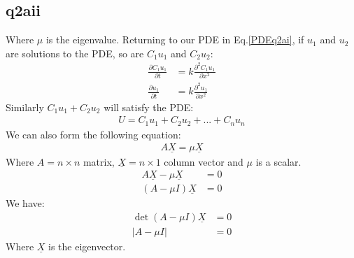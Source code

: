 \documentclass[11pt]{article}
\numberwithin{equation}{section}
\begin{document}
\subsection*{q2aii}
Where $\mu$ is the eigenvalue. Returning to our PDE in Eq.\ref{PDEq2ai}, if $u_1$ and $u_2$ are solutions to the PDE, so are $C_1 u_1$ and $C_2 u_2$:
\begin{align}
	\frac{\partial C_1 u_1}{\partial t} &= k\frac{\partial^2 C_1 u_1}{\partial x^2}\\
	\frac{\partial u_1}{\partial t} &= k\frac{\partial^2 u_1}{\partial x^2}
\end{align}
Similarly $C_1 u_1 + C_2 u_2$ will satisfy the PDE:
\begin{align}
	U = C_1 u_1 + C_2 u_2 + ... + C_n u_n
\end{align}
We can also form the following equation:
\begin{align}
	A\underline{X} = \mu \underline{X}
\end{align}
Where $A = n \times n$ matrix, $\underline{X} = n \times 1$ column vector and $\mu$ is a scalar. 
\begin{align}
	A \underline{X} - \mu \underline{X} &= 0\\
	\left( A - \mu I\right)\underline{X} &= 0
\end{align} 
We have:
\begin{align}
	\det \left(A - \mu I\right)\underline{X} &= 0\\
	\left| A - \mu I \right| &= 0
\end{align}
Where $\underline{X}$ is the eigenvector.
\end{document}
